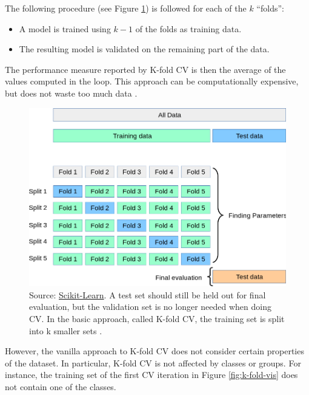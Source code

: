\documentclass[
]{book}
\providecommand{\tightlist}{%
  \setlength{\itemsep}{0pt}\setlength{\parskip}{0pt}}
\begin{document}
The following procedure (see Figure \ref{fig:cross-validation}) is followed for each of the \(k\) ``folds'':

\begin{itemize}
\tightlist
\item
  A model is trained using \(k-1\) of the folds as training data.
\item
  The resulting model is validated on the remaining part of the data.
\end{itemize}

The performance measure reported by K-fold CV is then the average of the values computed in the loop. This approach can be computationally expensive, but does not waste too much data \citep{scikit-learn}.



\begin{figure}

{\centering \includegraphics[width=0.75\linewidth]{Figures/grid_search_cross_validation} 

}

\caption{Source: \href{https://scikit-learn.org/stable/modules/cross_validation.html\#cross-validation}{Scikit-Learn}. A test set should still be held out for final evaluation, but the validation set is no longer needed when doing CV. In the basic approach, called K-fold CV, the training set is split into k smaller sets \citep{scikit-learn}.}\label{fig:cross-validation}
\end{figure}

However, the vanilla approach to K-fold CV does not consider certain properties of the dataset. In particular, K-fold CV is not affected by classes or groups. For instance, the training set of the first CV iteration in Figure \ref{fig:k-fold-vis} does not contain one of the classes.
\end{document}
